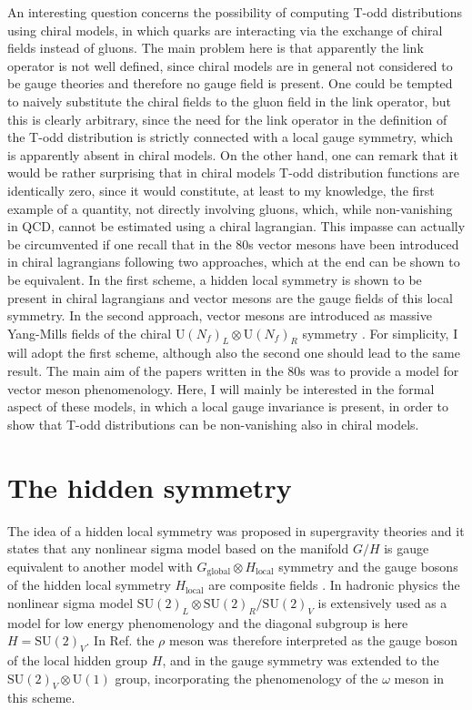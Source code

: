 \documentclass[]{revtex4}
\begin{document}
An interesting question concerns the possibility of computing
T-odd distributions using chiral models, in which quarks 
are interacting via
the exchange of chiral fields instead of gluons. 
The main problem here is that apparently the link operator
is not well defined, since chiral models
are in general not considered to be gauge theories and therefore no
gauge field is present. One could be tempted to naively
substitute the chiral fields to the gluon field in the link operator,
but this is clearly arbitrary, since the need for the link operator
in the definition of the T-odd distribution is strictly connected 
with a local gauge symmetry, which is apparently absent in 
chiral models. On the other hand, one can remark that
it would be rather surprising that in chiral models
T-odd distribution functions are identically zero, since
it would constitute, at least to my knowledge, the first
example of a quantity, not directly involving gluons, 
which, while non-vanishing in QCD, cannot be estimated 
using a chiral lagrangian. 
This impasse can actually be circumvented if one
recall that in the 80s vector mesons have been introduced
in chiral lagrangians following two approaches, which
at the end can be shown to be equivalent. In the first scheme, 
a hidden local
symmetry is shown to be present in chiral lagrangians 
\cite{Bando:1984ej,Bando:1984pw,Meissner:1986ka,Bando:1987br,Meissner:1987ge}
and vector mesons are the gauge fields of this local symmetry.
In the second approach, vector mesons are introduced as massive
Yang-Mills fields of the chiral $\mathrm{U}(N_f)_L\otimes\mathrm{U}(N_f)_R$
symmetry \cite{Kaymakcalan:1983qq,Gomm:1984at,Kaymakcalan:1984bz}. 
For simplicity, I will adopt the first scheme, although
also the second one should lead to the same result. 
The main aim of the papers written in the 80s was to provide a model for 
vector meson phenomenology. Here, I will mainly be interested
in the formal aspect of these models, in which a  
local gauge invariance is present, in order to show that 
T-odd distributions can be non-vanishing also in chiral models.

\section{The hidden symmetry}
The idea of a hidden local symmetry was proposed in
supergravity theories \cite{Cremmer:1978ds,Cremmer:1979up} and it 
states that any nonlinear sigma model based on the manifold
$G/H$ is gauge equivalent to another model with
$G_\mathrm{global}\otimes H_\mathrm{local}$ symmetry and 
the gauge bosons of the hidden local symmetry $H_\mathrm{local}$
are composite fields 
\cite{Golo:1978de,D'Adda:1978uc,D'Adda:1978kp,Breitenlohner:1984rr}.
In hadronic physics the nonlinear sigma model
$\mathrm{SU(2)}_L\otimes\mathrm{SU(2)}_R/\mathrm{SU(2)}_V$
is extensively used as a model for low energy phenomenology
and the diagonal subgroup is here $H=\mathrm{SU(2)}_V$. 
In Ref.\cite{Bando:1984ej} the $\rho$ meson was therefore
interpreted as the gauge boson of the local hidden group $H$,
and in \cite{Meissner:1986ka} the gauge symmetry was extended
to the $\mathrm{SU(2)}_V\otimes \mathrm{U(1)}$ group,
incorporating the phenomenology
of the $\omega$ meson in this scheme.
\end{document}
